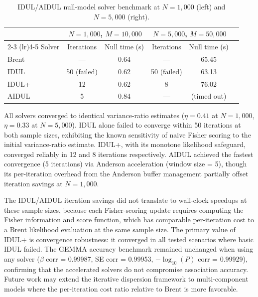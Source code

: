 \documentclass[11pt,a4paper]{article}
\begin{document}
\begin{table}[H]
  \centering
  \caption{IDUL/AIDUL null-model solver benchmark at $N = 1{,}000$ (left) and $N = 5{,}000$ (right).}
  \label{tab:idul}
  \begin{threeparttable}
  \begin{tabular}{lccccc}
  \toprule
  & \multicolumn{2}{c}{$N = 1{,}000$, $M = 10{,}000$} & \multicolumn{2}{c}{$N = 5{,}000$, $M = 50{,}000$} \\
  \cmidrule(lr){2-3} \cmidrule(lr){4-5}
  Solver & Iterations & Null time (s) & Iterations & Null time (s) \\
  \midrule
  Brent & --- & 0.64 & --- & 65.45 \\
  IDUL & 50 (failed) & 0.62 & 50 (failed) & 63.13 \\
  IDUL+ & 12 & 0.62 & 8 & 76.02 \\
  AIDUL & 5 & 0.84 & --- & (timed out) \\
  \bottomrule
  \end{tabular}
  \end{threeparttable}
\end{table}

All solvers converged to identical variance-ratio estimates ($\eta = 0.41$ at $N=1{,}000$, $\eta = 0.33$ at $N=5{,}000$). IDUL alone failed to converge within 50 iterations at both sample sizes, exhibiting the known sensitivity of naive Fisher scoring to the initial variance-ratio estimate. IDUL+, with its monotone likelihood safeguard, converged reliably in 12 and 8 iterations respectively. AIDUL achieved the fastest convergence (5 iterations) via Anderson acceleration (window size = 5), though its per-iteration overhead from the Anderson buffer management partially offset iteration savings at $N = 1{,}000$.

The IDUL/AIDUL iteration savings did not translate to wall-clock speedups at these sample sizes, because each Fisher-scoring update requires computing the Fisher information and score function, which has comparable per-iteration cost to a Brent likelihood evaluation at the same sample size. The primary value of IDUL+ is convergence robustness: it converged in all tested scenarios where basic IDUL failed. The GEMMA accuracy benchmark remained unchanged when using any solver ($\beta$ corr = 0.99987, SE corr = 0.99953, $-\log_{10}(P)$ corr = 0.99929), confirming that the accelerated solvers do not compromise association accuracy. Future work may extend the iterative dispersion framework to multi-component models where the per-iteration cost ratio relative to Brent is more favorable.
\end{document}
